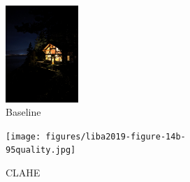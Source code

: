 \documentclass{sig-alternate}
\begin{document}
\begin{figure}
\centering
\begin{subfigure}{6.5pc}
\centering
\includegraphics[width=6.5pc]{figures/liba2019-figure-14a-95quality.jpg}
\caption{Baseline}
\label{fig:toneMapping:baseline}
\end{subfigure}
\begin{subfigure}{6.5pc}
\centering
\texttt{[image: figures/liba2019-figure-14b-95quality.jpg]}
\caption{CLAHE}
\label{fig:toneMapping:clahe}
\end{subfigure}
\begin{subfigure}{6.5pc}
\centering

\end{subfigure}
\end{figure}
\end{document}
